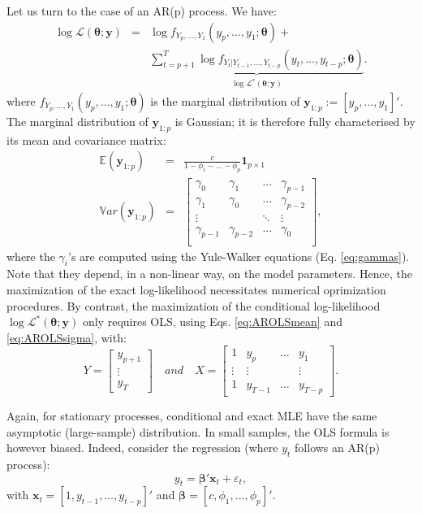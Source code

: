 \documentclass[
  12pt,
]{book}
\theoremstyle{definition}
\theoremstyle{definition}
\theoremstyle{definition}
\theoremstyle{definition}
\theoremstyle{remark}
\begin{document}
Let us turn to the case of an AR(p) process. We have:
\begin{eqnarray*}
\log \mathcal{L}(\boldsymbol\theta;\mathbf{y}) &=& \log f_{Y_p,\dots,Y_1}(y_p,\dots,y_1;\boldsymbol\theta) +\\
&& \underbrace{\sum_{t=p+1}^{T} \log f_{Y_t|Y_{t-1},\dots,Y_{t-p}}(y_t,\dots,y_{t-p};\boldsymbol\theta)}_{\log \mathcal{L}^*(\boldsymbol\theta;\mathbf{y})}.
\end{eqnarray*}
where \(f_{Y_p,\dots,Y_{1}}(y_p,\dots,y_{1};\boldsymbol\theta)\) is the marginal distribution of \(\mathbf{y}_{1:p} := [y_p,\dots,y_1]'\). The marginal distribution of \(\mathbf{y}_{1:p}\) is Gaussian; it is therefore fully characterised by its mean and covariance matrix:
\begin{eqnarray*}
\mathbb{E}(\mathbf{y}_{1:p})&=&\frac{c}{1-\phi_1-\dots-\phi_p} \mathbf{1}_{p\times 1} \\
\mathbb{V}ar(\mathbf{y}_{1:p}) &=& \left[\begin{array}{cccc}
\gamma_0 & \gamma_1 & \dots & \gamma_{p-1} \\
\gamma_1 & \gamma_0 & \dots & \gamma_{p-2} \\
\vdots &  & \ddots & \vdots \\
\gamma_{p-1} & \gamma_{p-2} & \dots & \gamma_{0} \\
\end{array}\right],
\end{eqnarray*}
where the \(\gamma_i\)'s are computed using the Yule-Walker equations (Eq. \eqref{eq:gammas}). Note that they depend, in a non-linear way, on the model parameters. Hence, the maximization of the exact log-likelihood necessitates numerical oprimization procedures. By contrast, the maximization of the conditional log-likelihood \(\log \mathcal{L}^*(\boldsymbol\theta;\mathbf{y})\) only requires OLS, using Eqs. \eqref{eq:AROLSmean} and \eqref{eq:AROLSsigma}, with:
\[
Y = \left[\begin{array}{c}
y_{p+1}\\
\vdots\\
y_T
\end{array}\right] \quad and \quad
X = \left[\begin{array}{cccc}
1 & y_p & \dots & y_1\\
\vdots&\vdots&&\vdots\\
1&y_{T-1}&\dots&y_{T-p}
\end{array}\right].
\]

Again, for stationary processes, conditional and exact MLE have the same asymptotic (large-sample) distribution. In small samples, the OLS formula is however biased. Indeed, consider the regression (where \(y_t\) follows an AR(p) process):
\begin{equation}
y_t = \boldsymbol\beta'\mathbf{x}_t + \varepsilon_t,\label{eq:OLSregARp}
\end{equation}
with \(\mathbf{x}_t = [1,y_{t-1},\dots,y_{t-p}]'\) and \(\boldsymbol\beta = [c,\phi_1,\dots,\phi_p]'\).
\end{document}
